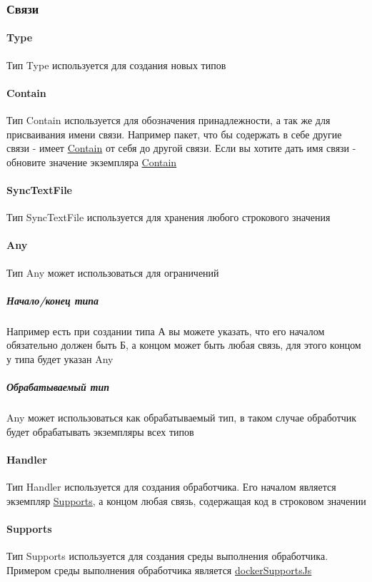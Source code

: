 \documentclass{article}
\begin{document}
\subsubsection{Связи}
\paragraph*{Type}\hypertarget{Core.Type.Description}{}
Тип Type используется для создания новых типов
\paragraph*{Contain}\hypertarget{Core.Contain.Description}{}
Тип Contain используется для обозначения
принадлежности, а так же для присваивания имени связи. Например пакет, что бы
содержать в себе другие связи - имеет \hyperlink{Core.Contain.Description}{Contain} от себя
до другой связи. Если вы хотите дать имя связи - обновите значение экземпляра
\hyperlink{Core.Contain.Description}{Contain}
\paragraph*{SyncTextFile}\hypertarget{Core.SyncTextFile.Description}{}
Тип SyncTextFile используется для хранения
любого строкового значения
\paragraph*{Any}\hypertarget{Core.Any.Description}{}
Тип Any может использоваться для ограничений
\subparagraph*{Начало/конец типа}
Например есть при создании типа А вы можете указать, что его началом
обязательно должен быть Б, а концом может быть любая связь, для этого концом у
типа будет указан Any
\subparagraph*{Обрабатываемый тип}
Any может использоваться как обрабатываемый тип, в таком случае обработчик
будет обрабатывать экземпляры всех типов
\paragraph*{Handler}\hypertarget{Core.Handler.Description}{}
Тип Handler используется для создания обработчика.
Его началом является экземпляр \hyperlink{supports.Description}{Supports}, а концом
любая связь, содержащая код в строковом значении
\paragraph*{Supports}\hypertarget{Core.Supports.Description}{}
Тип Supports используется для создания среды
выполнения обработчика. Примером среды выполнения обработчика является
\hyperlink{Core.dockerSupportsJs.Description}{dockerSupportsJs}
\end{document}
